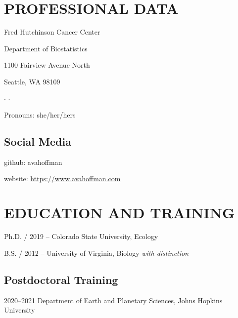 \documentclass{cv}
\begin{document}


\section*{PROFESSIONAL DATA}

Fred Hutchinson Cancer Center

Department of Biostatistics

1100 Fairview Avenue North

Seattle, WA 98109

 $\cdot$  $\cdot$ 

Pronouns: she/her/hers

\subsection*{Social Media}

github: avahoffman

website: \href{https://www.avahoffman.com}{https://www.avahoffman.com}


\section*{EDUCATION AND TRAINING}

Ph.D. / 2019 -- Colorado State University, Ecology

B.S. / 2012 -- University of Virginia, Biology \textit{with distinction}

\subsection*{Postdoctoral Training}

2020--2021 Department of Earth and Planetary Sciences,  Johns Hopkins University

\end{document}
